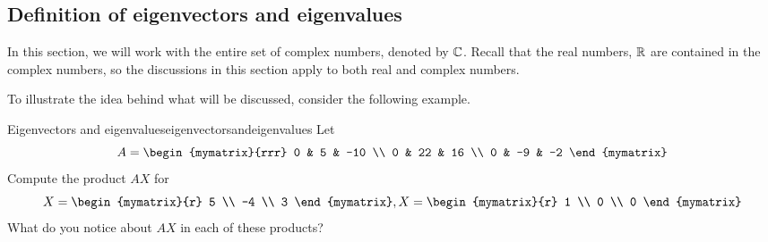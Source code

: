 \subsection{Definition of eigenvectors and eigenvalues}

In this section, we will work with the entire set of complex numbers, 
denoted by $\mathbb{C}$. Recall that the real numbers, $\mathbb{R}$ are 
contained in the complex numbers, so the discussions in this section 
apply to both real and complex numbers. 

To illustrate the idea behind what will be discussed, consider the following
example.

\begin{example}{Eigenvectors and eigenvalues}{eigenvectorsandeigenvalues}
Let
\begin{equation*}
A = \begin{mymatrix}{rrr}
0 & 5 & -10 \\
0 & 22 & 16 \\
0 & -9 & -2
\end{mymatrix} 
\end{equation*}
Compute the product $AX$ for 
\begin{equation*}
X = \begin{mymatrix}{r}
5 \\
-4 \\
 3
\end{mymatrix}, X = \begin{mymatrix}{r}
1 \\
0 \\
0
\end{mymatrix}
\end{equation*}
What do you notice about $AX$ in each of these products? 
\end{example}

